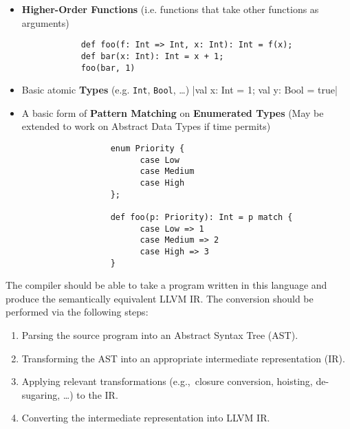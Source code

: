 \begin{itemize}
      \item \textbf{Higher-Order Functions} (i.e. functions that take other functions as arguments)
            \begin{verbatim}
            def foo(f: Int => Int, x: Int): Int = f(x);
            def bar(x: Int): Int = x + 1;
            foo(bar, 1)
      \end{verbatim}

      \item Basic atomic \textbf{Types}
            (e.g. \texttt{Int}, \texttt{Bool}, \dots)
            |val x: Int = 1; val y: Bool = true|

      \item A basic form of \textbf{Pattern Matching} on \textbf{Enumerated Types}
            (May be extended to work on Abstract Data Types if time permits)
            \begin{verbatim}
                  enum Priority {
                        case Low
                        case Medium
                        case High
                  };

                  def foo(p: Priority): Int = p match {
                        case Low => 1
                        case Medium => 2
                        case High => 3
                  }
            \end{verbatim}

\end{itemize}

The compiler should be able to take a program written in this language and produce the semantically
equivalent LLVM IR. The conversion should be performed via the following steps:

\begin{enumerate}
      \item Parsing the source program into an Abstract Syntax Tree (AST).
      \item Transforming the AST into an appropriate intermediate representation (IR).
      \item Applying relevant transformations (e.g.,\ closure conversion, hoisting, de-sugaring,
            \dots) to the IR.
      \item Converting the intermediate representation into LLVM IR.
\end{enumerate}

